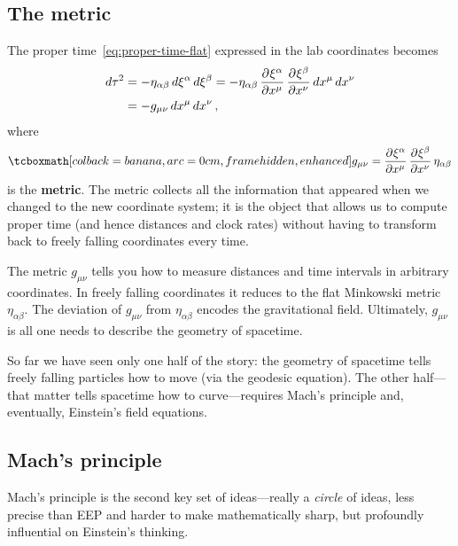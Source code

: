 \subsection{The metric}\label{sec:metric-from-EEP}

The proper time~\eqref{eq:proper-time-flat} expressed in the lab
coordinates becomes
\begin{align}
  d\tau^2
    &= -\eta_{\alpha\beta}\,d\xi^\alpha\,d\xi^\beta
     = -\eta_{\alpha\beta}\,
        \frac{\partial^{} \xi^\alpha}{\partial {x^\mu}^{}}\,\frac{\partial^{} \xi^\beta}{\partial {x^\nu}^{}}\,
        dx^\mu\,dx^\nu \notag\\
    &= -g_{\mu\nu}\,dx^\mu\,dx^\nu\,,
    \label{eq:proper-time-general}
\end{align}
where
\begin{equation}\label{eq:metric-def}
  \eqbox{g_{\mu\nu}
    = \pd{\xi^\alpha}{x^\mu}\,\pd{\xi^\beta}{x^\nu}\,
      \eta_{\alpha\beta}}
\end{equation}
is the \textbf{metric}.  The metric collects all the information that
appeared when we changed to the new coordinate system; it is the
object that allows us to compute proper time (and hence distances and
clock rates) without having to transform back to freely falling
coordinates every time.

\begin{intuition}
  The metric $g_{\mu\nu}$ tells you how to measure distances and
  time intervals in arbitrary coordinates.  In freely falling
  coordinates it reduces to the flat Minkowski metric
  $\eta_{\alpha\beta}$.  The deviation of $g_{\mu\nu}$ from
  $\eta_{\alpha\beta}$ encodes the gravitational field.  Ultimately,
  $g_{\mu\nu}$ is all one needs to describe the geometry of
  spacetime.
\end{intuition}

So far we have seen only one half of the story: the geometry of
spacetime tells freely falling particles how to move (via the
geodesic equation).  The other half---that matter tells spacetime
how to curve---requires Mach's principle and, eventually, Einstein's
field equations.

\subsection{Mach's principle}

Mach's principle is the second key set of ideas---really a
\emph{circle} of ideas, less precise than EEP and harder to make
mathematically sharp, but profoundly influential on Einstein's
thinking.

